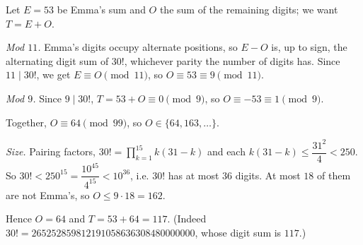 Let $E=53$ be Emma's sum and $O$ the sum of the remaining digits; we want $T=E+O$.

\emph{Mod $11$.} Emma's digits occupy alternate positions, so $E-O$ is, up to sign, the alternating digit sum of $30!$, whichever parity the number of digits has. Since $11\mid30!$, we get $E\equiv O\pmod{11}$, so $O\equiv53\equiv9\pmod{11}$.

\emph{Mod $9$.} Since $9\mid30!$, $T=53+O\equiv0\pmod9$, so $O\equiv-53\equiv1\pmod9$.

Together, $O\equiv64\pmod{99}$, so $O\in\{64,163,\dots\}$.

\emph{Size.} Pairing factors, $30!=\prod_{k=1}^{15}k(31-k)$ and each $k(31-k)\le\dfrac{31^2}{4}<250$. So $30!<250^{15}=\dfrac{10^{45}}{4^{15}}<10^{36}$, i.e. $30!$ has at most $36$ digits. At most $18$ of them are not Emma's, so $O\le9\cdot18=162$.

Hence $O=64$ and $T=53+64=\boxed{117}$. (Indeed $30!=265252859812191058636308480000000$, whose digit sum is $117$.)
